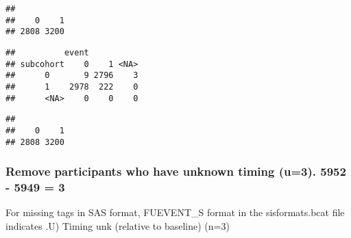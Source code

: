 \documentclass[
]{article}
\newenvironment{Shaded}{\begin{snugshade}}{\end{snugshade}}
\newcommand{\CommentTok}[1]{\textcolor[rgb]{0.56,0.35,0.01}{\textit{#1}}}
\newcommand{\DataTypeTok}[1]{\textcolor[rgb]{0.13,0.29,0.53}{#1}}
\newcommand{\KeywordTok}[1]{\textcolor[rgb]{0.13,0.29,0.53}{\textbf{#1}}}
\newcommand{\NormalTok}[1]{#1}
\newcommand{\OperatorTok}[1]{\textcolor[rgb]{0.81,0.36,0.00}{\textbf{#1}}}
\newcommand{\StringTok}[1]{\textcolor[rgb]{0.31,0.60,0.02}{#1}}
\begin{document}
\begin{verbatim}
## 
##    0    1 
## 2808 3200
\end{verbatim}

\begin{Shaded}
\end{Shaded}

\begin{verbatim}
##          event
## subcohort    0    1 <NA>
##      0       9 2796    3
##      1    2978  222    0
##      <NA>    0    0    0
\end{verbatim}

\begin{Shaded}
\end{Shaded}

\begin{verbatim}
## 
##    0    1 
## 2808 3200
\end{verbatim}

\hypertarget{remove-participants-who-have-unknown-timing-u3.-5952---5949-3}{%
\subsubsection{Remove participants who have unknown timing (u=3). 5952 -
5949 =
3}\label{remove-participants-who-have-unknown-timing-u3.-5952---5949-3}}

For missing tags in SAS format, FUEVENT\_S format in the sisformats.bcat
file indicates .U) Timing unk (relative to baseline) (n=3)

\begin{Shaded}
\end{Shaded}
\end{document}
